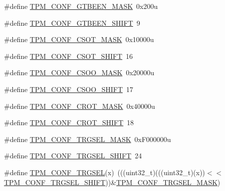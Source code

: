 \begin{DoxyCompactItemize}
\item 
\#define \hyperlink{group___t_p_m___register___masks_ga70d64b81799a4ecd3933ea8e46618747}{T\+P\+M\+\_\+\+C\+O\+N\+F\+\_\+\+G\+T\+B\+E\+E\+N\+\_\+\+M\+A\+SK}~0x200u
\item 
\#define \hyperlink{group___t_p_m___register___masks_ga6ecd0b94ee9f74112c93027dd5833468}{T\+P\+M\+\_\+\+C\+O\+N\+F\+\_\+\+G\+T\+B\+E\+E\+N\+\_\+\+S\+H\+I\+FT}~9
\item 
\#define \hyperlink{group___t_p_m___register___masks_gab1950d4b5e28ba67b305e3fca7f716f0}{T\+P\+M\+\_\+\+C\+O\+N\+F\+\_\+\+C\+S\+O\+T\+\_\+\+M\+A\+SK}~0x10000u
\item 
\#define \hyperlink{group___t_p_m___register___masks_ga007e2eccc45940318d15822a729ca061}{T\+P\+M\+\_\+\+C\+O\+N\+F\+\_\+\+C\+S\+O\+T\+\_\+\+S\+H\+I\+FT}~16
\item 
\#define \hyperlink{group___t_p_m___register___masks_ga627db017557d5466cd9aeb7e8e8f91ed}{T\+P\+M\+\_\+\+C\+O\+N\+F\+\_\+\+C\+S\+O\+O\+\_\+\+M\+A\+SK}~0x20000u
\item 
\#define \hyperlink{group___t_p_m___register___masks_ga1c255c7ab3843cb488664bcc582a3294}{T\+P\+M\+\_\+\+C\+O\+N\+F\+\_\+\+C\+S\+O\+O\+\_\+\+S\+H\+I\+FT}~17
\item 
\#define \hyperlink{group___t_p_m___register___masks_ga0ec6abbf10f7d46ff88e60b86e4c5de9}{T\+P\+M\+\_\+\+C\+O\+N\+F\+\_\+\+C\+R\+O\+T\+\_\+\+M\+A\+SK}~0x40000u
\item 
\#define \hyperlink{group___t_p_m___register___masks_gaff3474ae6e7542a599c5696d928aab74}{T\+P\+M\+\_\+\+C\+O\+N\+F\+\_\+\+C\+R\+O\+T\+\_\+\+S\+H\+I\+FT}~18
\item 
\#define \hyperlink{group___t_p_m___register___masks_gaf967b5f3b180314df5c4990c14b53ebe}{T\+P\+M\+\_\+\+C\+O\+N\+F\+\_\+\+T\+R\+G\+S\+E\+L\+\_\+\+M\+A\+SK}~0x\+F000000u
\item 
\#define \hyperlink{group___t_p_m___register___masks_ga44218135f21b8af592c21f46fc097423}{T\+P\+M\+\_\+\+C\+O\+N\+F\+\_\+\+T\+R\+G\+S\+E\+L\+\_\+\+S\+H\+I\+FT}~24
\item 
\#define \hyperlink{group___t_p_m___register___masks_ga9cce83bc335e7c53566df0a88083b045}{T\+P\+M\+\_\+\+C\+O\+N\+F\+\_\+\+T\+R\+G\+S\+EL}(x)~(((uint32\+\_\+t)(((uint32\+\_\+t)(x))$<$$<$\hyperlink{group___t_p_m___register___masks_ga44218135f21b8af592c21f46fc097423}{T\+P\+M\+\_\+\+C\+O\+N\+F\+\_\+\+T\+R\+G\+S\+E\+L\+\_\+\+S\+H\+I\+FT}))\&\hyperlink{group___t_p_m___register___masks_gaf967b5f3b180314df5c4990c14b53ebe}{T\+P\+M\+\_\+\+C\+O\+N\+F\+\_\+\+T\+R\+G\+S\+E\+L\+\_\+\+M\+A\+SK})
\end{DoxyCompactItemize}


